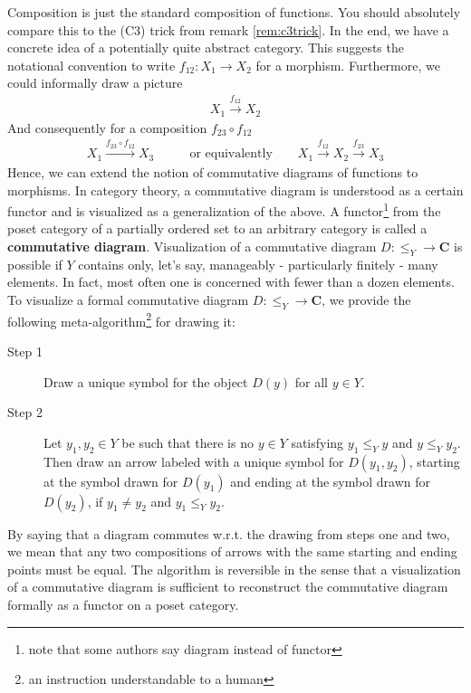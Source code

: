 Composition is just the standard composition of functions.
You should absolutely compare this to the (C3) trick from remark \ref{rem:c3trick}.
In the end, we have a concrete idea of a potentially quite abstract category.
This suggests the notational convention to write $f_{12} \colon X_{1} \rightarrow X_{2}$ for a morphism.
Furthermore, we could informally draw a picture
\begin{align*}
  X_{1}
  \xrightarrow{f_{12}}
  X_{2}
\end{align*}
And consequently for a composition $f_{23} \circ f_{12}$
\begin{align*}
  X_{1}
  \xrightarrow{f_{23} \circ f_{12}}
  X_{3}
  \qquad
  &\text{or equivalently}
  \qquad
  X_{1}
  \xrightarrow{f_{12}}
  X_{2}
  \xrightarrow{f_{23}}
  X_{3}
\end{align*}
Hence, we can extend the notion of commutative diagrams of functions to morphisms.
In category theory, a commutative diagram is understood as a certain functor and is visualized as a generalization of the above.
A functor\footnote{note that some authors say diagram instead of functor} from the poset category of a partially ordered set to an arbitrary category is called a \textbf{commutative diagram}.
Visualization of a commutative diagram $D \colon \pmb{\leq}_{Y} \rightarrow \mathbf{C}$ is possible if $Y$ contains only, let's say, manageably - particularly finitely - many elements.
In fact, most often one is concerned with fewer than a dozen elements.
To visualize a formal commutative diagram $D \colon \pmb{\leq}_{Y} \rightarrow \mathbf{C}$, we provide the following meta-algorithm\footnote{an instruction understandable to a human} for drawing it:
\begin{description}
\item[Step 1]
Draw a unique symbol for the object $D(y)$ for all $y \in Y$.
\item[Step 2]
Let $y_{1},y_{2} \in Y$ be such that there is no $y \in Y$ satisfying $y_{1} \leq_{Y} y$ and $y \leq_{Y} y_{2}$.
Then draw an arrow labeled with a unique symbol for $D(y_{1},y_{2})$, starting at the symbol drawn for $D(y_{1})$ and ending at the symbol drawn for $D(y_{2})$, if $y_{1} \neq y_{2}$ and $y_{1} \leq_{Y} y_{2}$.
\end{description}
By saying that {\glqq}a diagram commutes{\grqq} w.r.t. the drawing from steps one and two, we mean that any two compositions of arrows with the same starting and ending points must be equal.
The algorithm is reversible in the sense that a visualization of a commutative diagram is sufficient to reconstruct the commutative diagram formally as a functor on a poset category.
